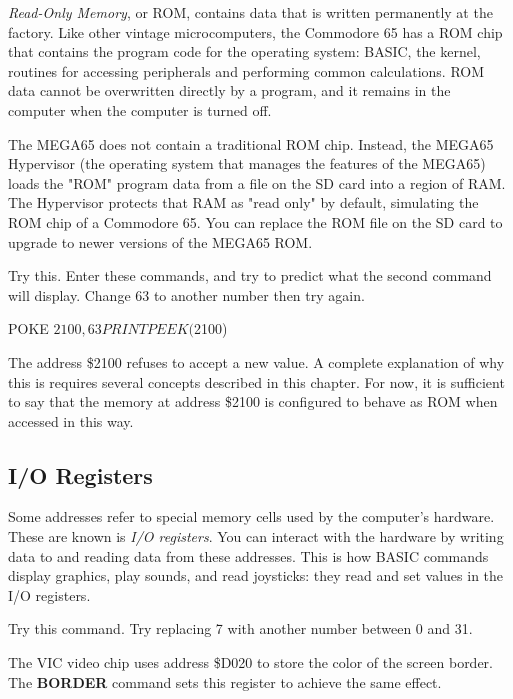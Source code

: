{\em Read-Only Memory}, or ROM, contains data that is written permanently at
the factory. Like other vintage microcomputers, the Commodore 65 has a ROM chip
that contains the program code for the operating system: BASIC, the kernel,
routines for accessing peripherals and performing common calculations. ROM
data cannot be overwritten directly by a program, and it remains in the
computer when the computer is turned off.

The MEGA65 does not contain a traditional ROM chip. Instead, the MEGA65
Hypervisor (the operating system that manages the features of the MEGA65)
loads the "ROM" program data from a file on the SD card into a region of RAM.
The Hypervisor protects that RAM as "read only" by default, simulating the ROM
chip of a Commodore 65. You can replace the ROM file on the SD card to upgrade
to newer versions of the MEGA65 ROM.

Try this. Enter these commands, and try to predict what the second command will
display. Change 63 to another number then try again.

\begin{screenoutput}
POKE $2100,63
PRINT PEEK($2100)
\end{screenoutput}

The address \$2100 refuses to accept a new value. A complete explanation
of why this is requires several concepts described in this chapter. For now, it
is sufficient to say that the memory at address \$2100 is configured to behave
as ROM when accessed in this way.

\subsection{I/O Registers}

Some addresses refer to special memory cells used by the computer's hardware.
These are known is {\em I/O registers}. You can interact with the hardware by writing
data to and reading data from these addresses. This is how BASIC commands
display graphics, play sounds, and read joysticks: they read and set values in
the I/O registers.

Try this command. Try replacing 7 with another number between 0 and 31.


The VIC video chip uses address \$D020 to store the color of the screen border.
The {\bf BORDER} command sets this register to achieve the same effect.

